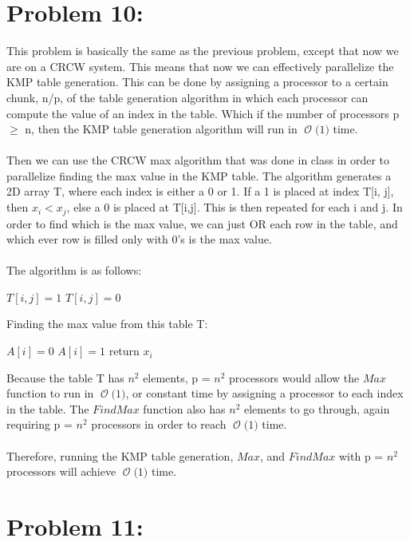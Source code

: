 \documentclass[12pt]{article}
\newcommand{\BigO}[1]{\ensuremath{\operatorname{\mathcal{O}}\bigl(#1\bigr)}}
\begin{document}
\section*{Problem 10: }
This problem is basically the same as the previous problem, except that now we are on a CRCW system. This means that now we can effectively parallelize the KMP table generation. This can be done by assigning a processor to a certain chunk, n/p, of the table generation algorithm in which each processor can compute the value of an index in the table. Which if the number of processors p {$\geq$} n, then the KMP table generation algorithm will run in \BigO 1 time.\\\\
Then we can use the CRCW max algorithm that was done in class in order to parallelize finding the max value in the KMP table. The algorithm generates a 2D array T, where each index is either a 0 or 1. If a 1 is placed at index T[i, j], then {$x_i < x_j$}, else a 0 is placed at T[i,j]. This is then repeated for each i and j. In order to find which is the max value, we can just OR each row in the table, and which ever row is filled only with 0's is the max value.\\\\
The algorithm is as follows:\\
\begin{algorithm}[H]
	{$T[i,j] = 1$}
\Else
	{$T[i,j] = 0$}
\end{algorithm}
Finding the max value from this table T:\\
\begin{algorithm}[H]
{$A[i] = 0$}
	{$A[i] = 1$}
	{return $x_i$}
\end{algorithm}
Because the table T has {$n^2$} elements, p = {$n^2$} processors would allow the {$Max$} function to run in \BigO 1, or constant time by assigning a processor to each index in the table. The {$FindMax$} function also has {$n^2$} elements to go through, again requiring p = {$n^2$} processors in order to reach \BigO 1 time.\\\\
Therefore, running the KMP table generation, {$Max$}, and {$FindMax$} with p = {$n^2$} processors will achieve \BigO 1 time.
\section*{Problem 11: }
\end{document}
